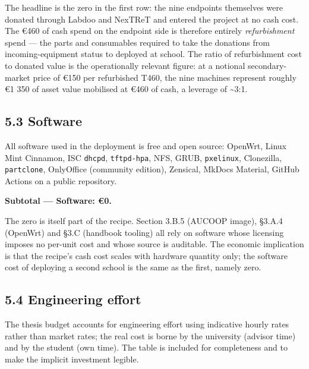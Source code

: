 The headline is the zero in the first row: the nine endpoints themselves
were donated through Labdoo and NexTReT and entered the project at no
cash cost. The €460 of cash spend on the endpoint side is therefore
entirely \emph{refurbishment} spend --- the parts and consumables
required to take the donations from incoming-equipment status to
deployed at school. The ratio of refurbishment cost to donated value is
the operationally relevant figure: at a notional secondary-market price
of €150 per refurbished T460, the nine machines represent roughly €1 350
of asset value mobilised at €460 of cash, a leverage of
\textasciitilde3:1.

\hypertarget{software}{%
\subsection{5.3 Software}\label{software}}

All software used in the deployment is free and open source: OpenWrt,
Linux Mint Cinnamon, ISC \texttt{dhcpd}, \texttt{tftpd-hpa}, NFS, GRUB,
\texttt{pxelinux}, Clonezilla, \texttt{partclone}, OnlyOffice (community
edition), Zensical, MkDocs Material, GitHub Actions on a public
repository.

\textbf{Subtotal --- Software: €0.}

The zero is itself part of the recipe. Section 3.B.5 (AUCOOP image),
§3.A.4 (OpenWrt) and §3.C (handbook tooling) all rely on software whose
licensing imposes no per-unit cost and whose source is auditable. The
economic implication is that the recipe's cash cost scales with hardware
quantity only; the software cost of deploying a second school is the
same as the first, namely zero.

\hypertarget{engineering-effort}{%
\subsection{5.4 Engineering effort}\label{engineering-effort}}

The thesis budget accounts for engineering effort using indicative
hourly rates rather than market rates; the real cost is borne by the
university (advisor time) and by the student (own time). The table is
included for completeness and to make the implicit investment legible.

